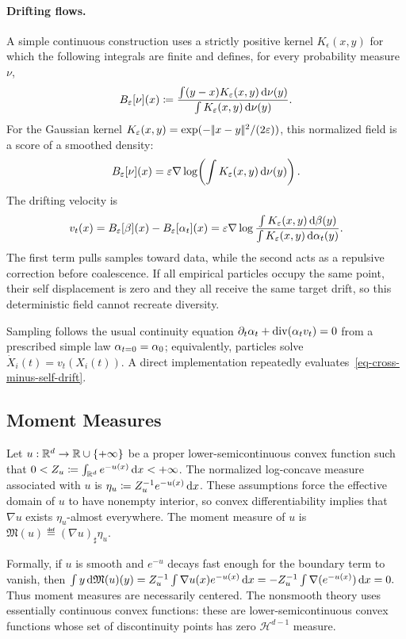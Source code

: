 \paragraph{Drifting flows.}
A simple continuous construction uses a strictly positive kernel $K_\epsilon(x,y)$ for which the following integrals are finite and defines, for every probability measure $\nu$,
\begin{equation}\label{eq-normalized-kernel-drift}
B_\varepsilon[\nu](x)
\coloneqq
\frac{\int (y-x)K_\varepsilon(x,y)\,\mathrm{d}\nu(y)}
{\int K_\varepsilon(x,y)\,\mathrm{d}\nu(y)}.
\end{equation}
For the Gaussian kernel $K_\varepsilon(x,y)=\exp(-|\!| x-y |\!|^2/(2\varepsilon))$, this normalized field is a score of a smoothed density:
\begin{equation}\label{eq-normalized-kernel-score}
B_\varepsilon[\nu](x)
=
\varepsilon\nabla\log\!\left(\int K_\varepsilon(x,y)\,\mathrm{d}\nu(y)\right).
\end{equation}
The drifting velocity is
\begin{equation}\label{eq-cross-minus-self-drift}
v_t(x)=B_\varepsilon[\beta](x)-B_\varepsilon[\alpha_t](x)
=
\varepsilon\nabla\log
\frac{\int K_\varepsilon(x,y)\,\mathrm{d}\beta(y)}
{\int K_\varepsilon(x,y)\,\mathrm{d}\alpha_t(y)}.
\end{equation}
The first term pulls samples toward data, while the second acts as a repulsive correction before coalescence. If all empirical particles occupy the same point, their self displacement is zero and they all receive the same target drift, so this deterministic field cannot recreate diversity.

Sampling follows the usual continuity equation $\partial_t\alpha_t+\operatorname{div}(\alpha_t v_t)=0$ from a prescribed simple law $\alpha_{t=0}=\alpha_0$; equivalently, particles solve $\dot X_i(t)=v_t(X_i(t))$. A direct implementation repeatedly evaluates~\eqref{eq-cross-minus-self-drift}.

\subsection{Moment Measures}
\label{sec-moment-measures}
\begin{defn}\label{def-moment-measure}
Let $u:\mathbb{R}^d\to\mathbb{R}\cup\{+\infty\}$ be a proper lower-semicontinuous convex function such that $0<Z_u\coloneqq \int_{\mathbb{R}^d} e^{-u(x)}\,\mathrm{d} x <+\infty$. The normalized log-concave measure associated with $u$ is $\eta_u \coloneqq Z_u^{-1} e^{-u(x)}\,\mathrm{d} x$.
These assumptions force the effective domain of $u$ to have nonempty interior, so convex differentiability implies that $\nabla u$ exists $\eta_u$-almost everywhere. The moment measure of $u$ is
\(\mathfrak M(u)\eqdef (\nabla u)_\sharp \eta_u.\)
\end{defn}
Formally, if $u$ is smooth and $e^{-u}$ decays fast enough for the boundary term to vanish, then
\(\int y\,\mathrm{d}\mathfrak M(u)(y) = Z_u^{-1}\int \nabla u(x)e^{-u(x)}\,\mathrm{d} x = -Z_u^{-1}\int \nabla(e^{-u(x)})\,\mathrm{d} x =0.\)
Thus moment measures are necessarily centered. The nonsmooth theory uses essentially continuous convex functions: these are lower-semicontinuous convex functions whose set of discontinuity points has zero $\mathcal H^{d-1}$ measure.

